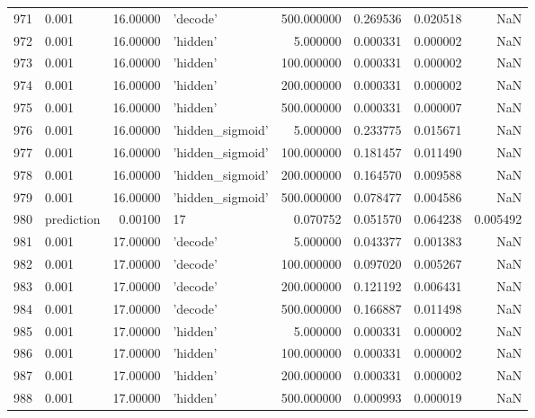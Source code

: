 \documentclass[10pt,a4paper]{article}
\begin{document}
\begin{tabular}{llrlrrrr}
971  &       0.001 &  16.00000 &           'decode' &  500.000000 &  0.269536 &  0.020518 &       NaN \\
972  &       0.001 &  16.00000 &           'hidden' &    5.000000 &  0.000331 &  0.000002 &       NaN \\
973  &       0.001 &  16.00000 &           'hidden' &  100.000000 &  0.000331 &  0.000002 &       NaN \\
974  &       0.001 &  16.00000 &           'hidden' &  200.000000 &  0.000331 &  0.000002 &       NaN \\
975  &       0.001 &  16.00000 &           'hidden' &  500.000000 &  0.000331 &  0.000007 &       NaN \\
976  &       0.001 &  16.00000 &   'hidden\_sigmoid' &    5.000000 &  0.233775 &  0.015671 &       NaN \\
977  &       0.001 &  16.00000 &   'hidden\_sigmoid' &  100.000000 &  0.181457 &  0.011490 &       NaN \\
978  &       0.001 &  16.00000 &   'hidden\_sigmoid' &  200.000000 &  0.164570 &  0.009588 &       NaN \\
979  &       0.001 &  16.00000 &   'hidden\_sigmoid' &  500.000000 &  0.078477 &  0.004586 &       NaN \\
980  &  prediction &   0.00100 &                 17 &    0.070752 &  0.051570 &  0.064238 &  0.005492 \\
981  &       0.001 &  17.00000 &           'decode' &    5.000000 &  0.043377 &  0.001383 &       NaN \\
982  &       0.001 &  17.00000 &           'decode' &  100.000000 &  0.097020 &  0.005267 &       NaN \\
983  &       0.001 &  17.00000 &           'decode' &  200.000000 &  0.121192 &  0.006431 &       NaN \\
984  &       0.001 &  17.00000 &           'decode' &  500.000000 &  0.166887 &  0.011498 &       NaN \\
985  &       0.001 &  17.00000 &           'hidden' &    5.000000 &  0.000331 &  0.000002 &       NaN \\
986  &       0.001 &  17.00000 &           'hidden' &  100.000000 &  0.000331 &  0.000002 &       NaN \\
987  &       0.001 &  17.00000 &           'hidden' &  200.000000 &  0.000331 &  0.000002 &       NaN \\
988  &       0.001 &  17.00000 &           'hidden' &  500.000000 &  0.000993 &  0.000019 &       NaN \\

\end{tabular}
\end{document}
